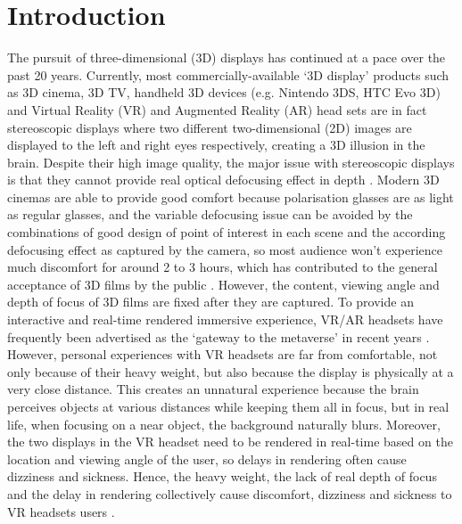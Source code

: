 
\chapter{Introduction}
\graphicspath{{Chapter_Intro/Figs/}}

The pursuit of three-dimensional (3D) displays has continued at a pace over the past 20 years. Currently, most commercially-available `3D display' products such as 3D cinema, 3D TV, handheld 3D devices (e.g. Nintendo 3DS, HTC Evo 3D) and Virtual Reality (VR) and Augmented Reality (AR) head sets are in fact stereoscopic displays \cite{McIntire2014} where two different two-dimensional (2D) images are displayed to the left and right eyes respectively, creating a 3D illusion in the brain. Despite their high image quality, the major issue with stereoscopic displays is that they cannot provide real optical defocusing effect in depth \cite{Watt2005}. Modern 3D cinemas are able to provide good comfort because polarisation glasses are as light as regular glasses, and the variable defocusing issue can be avoided by the combinations of good design of point of interest in each scene and the according defocusing effect as captured by the camera, so most audience won't experience much discomfort for around 2 to 3 hours, which has contributed to the general acceptance of 3D films by the public \cite{Barbara2013}. However, the content, viewing angle and depth of focus of 3D films are fixed after they are captured. To provide an interactive and real-time rendered immersive experience, VR/AR headsets have frequently been advertised as the `gateway to the metaverse' in recent years \cite{IET_metaverse_report2022}. However, personal experiences with VR headsets are far from comfortable, not only because of their heavy weight, but also because the display is physically at a very close distance. This creates an unnatural experience because the brain perceives objects at various distances while keeping them all in focus, but in real life, when focusing on a near object, the background naturally blurs. Moreover, the two displays in the VR headset need to be rendered in real-time based on the location and viewing angle of the user, so delays in rendering often cause dizziness and sickness. Hence, the heavy weight, the lack of real depth of focus and the delay in rendering collectively cause discomfort, dizziness and sickness to VR headsets users \cite{McCauley1992, Chang2020}.

